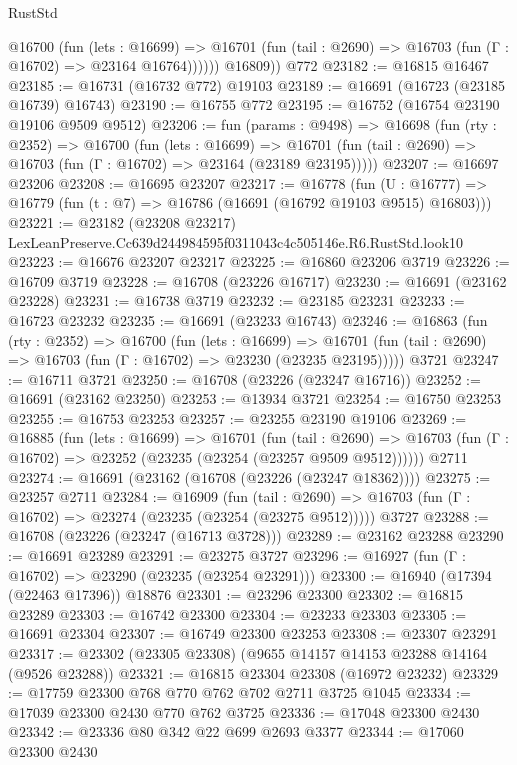 \begin{lexlean}{RustStd}
\begin{coremodule}
            @16700
              (fun (lets : @16699) =>
              @16701 (fun (tail : @2690) => @16703 (fun (Γ : @16702) => @23164 @16764))))))
        @16809))
    @772
@23182 := @16815 @16467
@23185 := @16731 (@16732 @772) @19103
@23189 := @16691 (@16723 (@23185 @16739) @16743)
@23190 := @16755 @772
@23195 := @16752 (@16754 @23190 @19106 @9509 @9512)
@23206 := fun (params : @9498) =>
  @16698
    (fun (rty : @2352) =>
    @16700
      (fun (lets : @16699) =>
      @16701 (fun (tail : @2690) => @16703 (fun (Γ : @16702) => @23164 (@23189 @23195)))))
@23207 := @16697 @23206
@23208 := @16695 @23207
@23217 := @16778
    (fun (U : @16777) => @16779 (fun (t : @7) => @16786 (@16691 (@16792 @19103 @9515) @16803)))
@23221 := @23182 (@23208 @23217) LexLeanPreserve.Cc639d244984595f0311043c4c505146e.R6.RustStd.look10
@23223 := @16676 @23207 @23217
@23225 := @16860 @23206 @3719
@23226 := @16709 @3719
@23228 := @16708 (@23226 @16717)
@23230 := @16691 (@23162 @23228)
@23231 := @16738 @3719
@23232 := @23185 @23231
@23233 := @16723 @23232
@23235 := @16691 (@23233 @16743)
@23246 := @16863
    (fun (rty : @2352) =>
    @16700
      (fun (lets : @16699) =>
      @16701 (fun (tail : @2690) => @16703 (fun (Γ : @16702) => @23230 (@23235 @23195)))))
    @3721
@23247 := @16711 @3721
@23250 := @16708 (@23226 (@23247 @16716))
@23252 := @16691 (@23162 @23250)
@23253 := @13934 @3721
@23254 := @16750 @23253
@23255 := @16753 @23253
@23257 := @23255 @23190 @19106
@23269 := @16885
    (fun (lets : @16699) =>
    @16701
      (fun (tail : @2690) =>
      @16703 (fun (Γ : @16702) => @23252 (@23235 (@23254 (@23257 @9509 @9512))))))
    @2711
@23274 := @16691 (@23162 (@16708 (@23226 (@23247 @18362))))
@23275 := @23257 @2711
@23284 := @16909
    (fun (tail : @2690) => @16703 (fun (Γ : @16702) => @23274 (@23235 (@23254 (@23275 @9512)))))
    @3727
@23288 := @16708 (@23226 (@23247 (@16713 @3728)))
@23289 := @23162 @23288
@23290 := @16691 @23289
@23291 := @23275 @3727
@23296 := @16927 (fun (Γ : @16702) => @23290 (@23235 (@23254 @23291)))
@23300 := @16940 (@17394 (@22463 @17396)) @18876
@23301 := @23296 @23300
@23302 := @16815 @23289
@23303 := @16742 @23300
@23304 := @23233 @23303
@23305 := @16691 @23304
@23307 := @16749 @23300 @23253
@23308 := @23307 @23291
@23317 := @23302 (@23305 @23308) (@9655 @14157 @14153 @23288 @14164 (@9526 @23288))
@23321 := @16815 @23304 @23308 (@16972 @23232)
@23329 := @17759 @23300 @768 @770 @762 @702 @2711 @3725 @1045
@23334 := @17039 @23300 @2430 @770 @762 @3725
@23336 := @17048 @23300 @2430
@23342 := @23336 @80 @342 @22 @699 @2693 @3377
@23344 := @17060 @23300 @2430

\end{coremodule}
\end{lexlean}
